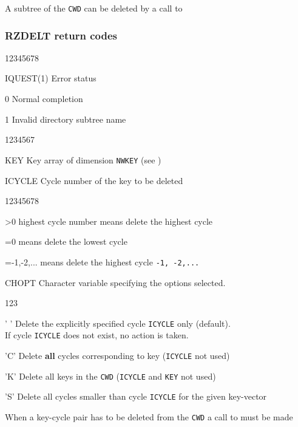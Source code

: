A subtree of the {\tt CWD} can be deleted by a call to 

\subsubsection*{RZDELT return codes}

\begin{DLtt}{12345678}
\item[IQUEST(1)]Error status
\begin{DLtt}{12}
\item[0]Normal completion
\item[1]Invalid directory subtree name
\end{DLtt}
\end{DLtt}

\begin{DLtt}{1234567}
\item[KEY]Key array of dimension {\tt NWKEY} (see )
\item[ICYCLE]Cycle number of the key to be deleted
\begin{DLtt}{12345678}
\item[>0] highest cycle number means delete the highest cycle
\item[=0] means delete the lowest cycle
\item[=-1,-2,...] means delete the highest cycle {\tt -1, -2,...}
\end{DLtt}
\item[CHOPT]Character variable specifying the options selected.
\begin{DLtt}{123}
\item[' ']Delete the explicitly specified cycle {\tt ICYCLE} only (default).\\
If cycle {\tt ICYCLE} does not exist, no action is taken.
\item['C']Delete {\bf all} cycles corresponding to key ({\tt ICYCLE} not used)
\item['K']Delete all keys in the {\tt CWD} ({\tt ICYCLE} and {\tt KEY} not used)
\item['S']Delete all cycles smaller than cycle {\tt ICYCLE} for the given
key-vector
\end{DLtt}
\end{DLtt}

When a key-cycle pair has to be deleted from the
{\tt CWD} a call to  must be made

